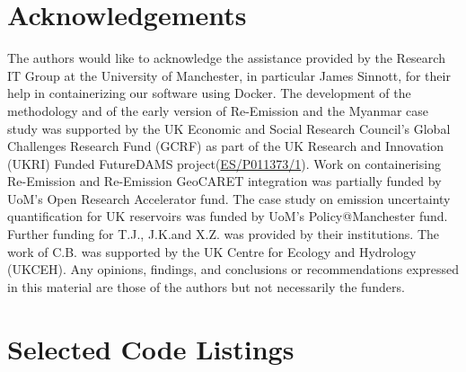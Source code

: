 \documentclass[final,1p,times]{elsarticle}
\let\oldappendix\appendix
\renewcommand{\appendix}{%
    \oldappendix
    \setcounter{figure}{0}
    \setcounter{table}{0}
    \setcounter{equation}{0}
    \setcounter{lstlisting}{0}
    
    \renewcommand{\thefigure}{A.\arabic{figure}}
    \renewcommand{\thetable}{A.\arabic{table}}
    \renewcommand{\theequation}{A.\arabic{equation}}
    \renewcommand{\thelstlisting}{A.\arabic{lstlisting}}
  }
\begin{document}
\section{Acknowledgements}
The authors would like to acknowledge the assistance provided by the Research IT Group at the University of Manchester, in particular James Sinnott, for their help in containerizing our software using Docker.
The development of the methodology and of the early version of Re-Emission and the Myanmar case study was supported by the UK Economic and Social Research Council's Global Challenges Research Fund (GCRF) as part of the UK Research and Innovation (UKRI) Funded FutureDAMS project(\href{www.futuredams.org}{ES/P011373/1}).
Work on containerising Re-Emission and Re-Emission GeoCARET integration was partially funded by UoM's Open Research Accelerator fund.
The case study on emission uncertainty quantification for UK reservoirs was funded by UoM's Policy@Manchester fund.
Further funding for T.J., J.K.and X.Z. was provided by their institutions. 
The work of C.B. was supported by the UK Centre for Ecology and Hydrology (UKCEH). 
Any opinions, findings, and conclusions or recommendations expressed in this material are those of the authors but not necessarily the funders.

\appendix

\section{Selected Code Listings}
\label{app1}
\end{document}

